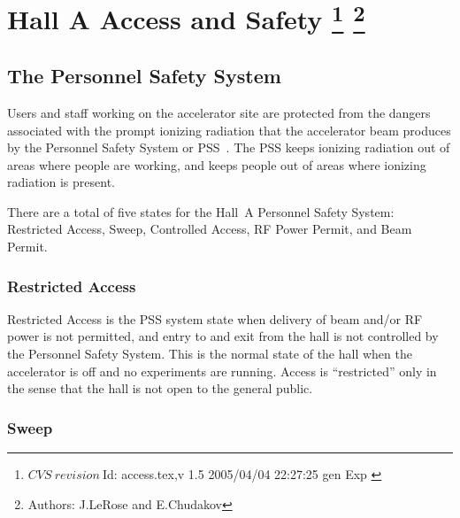 \chapter[Hall A Access and Safety]{Hall A Access and Safety
\label{sec:chap:access}
\footnote{
  $CVS~revision~ $Id: access.tex,v 1.5 2005/04/04 22:27:25 gen Exp $ $ 
}
\footnote{Authors: J.LeRose  and
                   E.Chudakov }
}
 
\begin{safetyen}{10}{15}
\section{The Personnel Safety System} 
\label{sec:Access}
\end{safetyen}


 Users and staff working on the accelerator site are protected from
 the dangers associated with the prompt ionizing radiation that the
 accelerator beam produces by the Personnel Safety System or 
 PSS~\cite{PSScebaf}.
 The PSS keeps ionizing radiation out of areas where people are working,
 and keeps people out of areas where ionizing radiation is present.

 There are a total of five states for the Hall~A Personnel Safety
 System: Restricted Access, Sweep, Controlled Access, RF Power Permit,
 and Beam Permit.

\begin{safetyen}{10}{10}
\subsection{Restricted Access}
\end{safetyen}
 
 Restricted Access is the PSS system state when delivery of beam
 and/or RF power is not permitted, and entry to and exit from the hall
 is not controlled by the Personnel Safety System.  This is the normal
 state of the hall when the accelerator is off and no experiments are
 running.  Access is ``restricted'' only in the sense that the hall is
 not open to the general public.

\begin{safetyen}{10}{10}
\subsection{Sweep}
\end{safetyen}

